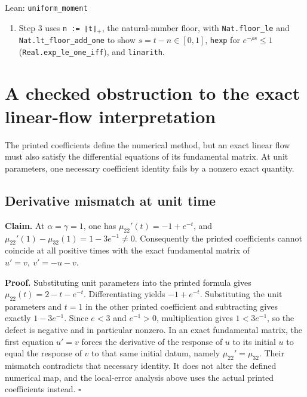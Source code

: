 \documentclass[11pt,a4paper]{report}
\begin{document}
\begin{leanbox}{Lean: \texttt{uniform\_\allowbreak{}moment}}
\begin{enumerate}
\item Step 3 uses \texttt{n := ⌊t⌋\ensuremath{{}_{+}}}, the natural-number floor, with \texttt{Nat.\allowbreak{}floor\_\allowbreak{}le} and \texttt{Nat.\allowbreak{}lt\_\allowbreak{}floor\_\allowbreak{}add\_\allowbreak{}one} to show \(s=t-n\in[0,1]\), \texttt{hexp} for \(e^{-\rho s}\le1\) (\texttt{Real.\allowbreak{}exp\_\allowbreak{}le\_\allowbreak{}one\_\allowbreak{}iff}), and \texttt{linarith}.

\end{enumerate}
\end{leanbox}
\section{\texorpdfstring{A checked obstruction to the exact linear-flow interpretation}{A checked obstruction to the exact linear-flow interpretation}}


The printed coefficients define the numerical method, but an exact linear flow must also satisfy the differential equations of its fundamental matrix. At unit parameters, one necessary coefficient identity fails by a nonzero exact quantity.

\subsection{\texorpdfstring{Derivative mismatch at unit time}{Derivative mismatch at unit time}}


\textbf{Claim.} At \(\alpha=\gamma=1\), one has \(\mu_{22}'(t)=-1+e^{-t}\), and \(\mu_{22}'(1)-\mu_{32}(1)=1-3e^{-1}\ne0\). Consequently the printed coefficients cannot coincide at all positive times with the exact fundamental matrix of \(u'=v,\ v'=-u-v\).



\textbf{Proof.} Substituting unit parameters into the printed formula gives \(\mu_{22}(t)=2-t-e^{-t}\). Differentiating yields \(-1+e^{-t}\). Substituting the unit parameters and \(t=1\) in the other printed coefficient and subtracting gives exactly \(1-3e^{-1}\). Since \(e<3\) and \(e^{-1}>0\), multiplication gives \(1<3e^{-1}\), so the defect is negative and in particular nonzero. In an exact fundamental matrix, the first equation \(u'=v\) forces the derivative of the response of \(u\) to its initial \(u\) to equal the response of \(v\) to that same initial datum, namely \(\mu_{22}'=\mu_{32}\). Their mismatch contradicts that necessary identity. It does not alter the defined numerical map, and the local-error analysis above uses the actual printed coefficients instead. \(\square\)
\end{document}
